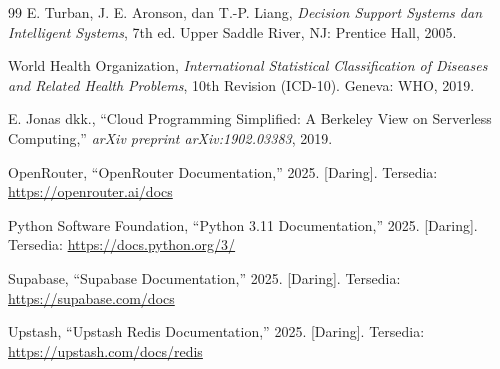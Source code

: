 \begin{thebibliography}{99}
  E. Turban, J. E. Aronson, dan T.-P. Liang, \textit{Decision Support Systems dan Intelligent Systems}, 7th ed. Upper Saddle River, NJ: Prentice Hall, 2005.

  World Health Organization, \textit{International Statistical Classification of Diseases and Related Health Problems}, 10th Revision (ICD-10). Geneva: WHO, 2019.

  E. Jonas dkk., ``Cloud Programming Simplified: A Berkeley View on Serverless Computing,'' \textit{arXiv preprint arXiv:1902.03383}, 2019.

  OpenRouter, ``OpenRouter Documentation,'' 2025. [Daring]. Tersedia: \url{https://openrouter.ai/docs}

  Python Software Foundation, ``Python 3.11 Documentation,'' 2025. [Daring]. Tersedia: \url{https://docs.python.org/3/}

  Supabase, ``Supabase Documentation,'' 2025. [Daring]. Tersedia: \url{https://supabase.com/docs}

  Upstash, ``Upstash Redis Documentation,'' 2025. [Daring]. Tersedia: \url{https://upstash.com/docs/redis}
\end{thebibliography}
